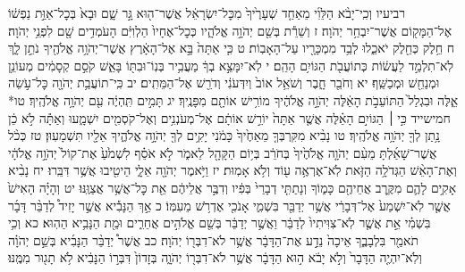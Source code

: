 \documentclass[twoside, openany, parskip=half, 11pt]{book}
\begin{document}
רביעיו וְכִֽי־יָבֹ֨א הַלֵּוִ֜י מֵאַחַ֤ד שְׁעָרֶ֙יךָ֙ מִכׇּל־יִשְׂרָאֵ֔ל אֲשֶׁר־ה֖וּא גָּ֣ר שָׁ֑ם וּבָא֙ בְּכׇל־אַוַּ֣ת נַפְשׁ֔וֹ אֶל־הַמָּק֖וֹם אֲשֶׁר־יִבְחַ֥ר יְהֹוָה׃ ז וְשֵׁרֵ֕ת בְּשֵׁ֖ם יְהֹוָ֣ה אֱלֹהָ֑יו כְּכׇל־אֶחָיו֙ הַלְוִיִּ֔ם הָעֹמְדִ֥ים שָׁ֖ם לִפְנֵ֥י יְהֹוָה׃ ח חֵ֥לֶק כְּחֵ֖לֶק יֹאכֵ֑לוּ לְבַ֥ד מִמְכָּרָ֖יו עַל־הָאָבֽוֹת׃
ט כִּ֤י אַתָּה֙ בָּ֣א אֶל־הָאָ֔רֶץ אֲשֶׁר־יְהֹוָ֥ה אֱלֹהֶ֖יךָ נֹתֵ֣ן לָ֑ךְ לֹֽא־תִלְמַ֣ד לַעֲשׂ֔וֹת כְּתוֹעֲבֹ֖ת הַגּוֹיִ֥ם הָהֵֽם׃ י לֹֽא־יִמָּצֵ֣א בְךָ֔ מַעֲבִ֥יר בְּנֽוֹ־וּבִתּ֖וֹ בָּאֵ֑שׁ קֹסֵ֣ם קְסָמִ֔ים מְעוֹנֵ֥ן וּמְנַחֵ֖שׁ וּמְכַשֵּֽׁף׃ יא וְחֹבֵ֖ר חָ֑בֶר וְשֹׁאֵ֥ל אוֹב֙ וְיִדְּעֹנִ֔י וְדֹרֵ֖שׁ אֶל־הַמֵּתִֽים׃ יב כִּֽי־תוֹעֲבַ֥ת יְהֹוָ֖ה כׇּל־עֹ֣שֵׂה אֵ֑לֶּה וּבִגְלַל֙ הַתּוֹעֵבֹ֣ת הָאֵ֔לֶּה יְהֹוָ֣ה אֱלֹהֶ֔יךָ מוֹרִ֥ישׁ אוֹתָ֖ם מִפָּנֶֽיךָ׃ יג תָּמִ֣ים תִּֽהְיֶ֔ה עִ֖ם יְהֹוָ֥ה אֱלֹהֶֽיךָ׃ טו* חמישייד כִּ֣י ׀ הַגּוֹיִ֣ם הָאֵ֗לֶּה אֲשֶׁ֤ר אַתָּה֙ יוֹרֵ֣שׁ אוֹתָ֔ם אֶל־מְעֹנְנִ֥ים וְאֶל־קֹסְמִ֖ים יִשְׁמָ֑עוּ וְאַתָּ֕ה לֹ֣א כֵ֔ן נָ֥תַן לְךָ֖ יְהֹוָ֥ה אֱלֹהֶֽיךָ׃ טו נָבִ֨יא מִקִּרְבְּךָ֤ מֵאַחֶ֙יךָ֙ כָּמֹ֔נִי יָקִ֥ים לְךָ֖ יְהֹוָ֣ה אֱלֹהֶ֑יךָ אֵלָ֖יו תִּשְׁמָעֽוּן׃ טז כְּכֹ֨ל אֲשֶׁר־שָׁאַ֜לְתָּ מֵעִ֨ם יְהֹוָ֤ה אֱלֹהֶ֙יךָ֙ בְּחֹרֵ֔ב בְּי֥וֹם הַקָּהָ֖ל לֵאמֹ֑ר לֹ֣א אֹסֵ֗ף לִשְׁמֹ֙עַ֙ אֶת־קוֹל֙ יְהֹוָ֣ה אֱלֹהָ֔י וְאֶת־הָאֵ֨שׁ הַגְּדֹלָ֥ה הַזֹּ֛את לֹֽא־אֶרְאֶ֥ה ע֖וֹד וְלֹ֥א אָמֽוּת׃ יז וַיֹּ֥אמֶר יְהֹוָ֖ה אֵלָ֑י הֵיטִ֖יבוּ אֲשֶׁ֥ר דִּבֵּֽרוּ׃ יח נָבִ֨יא אָקִ֥ים לָהֶ֛ם מִקֶּ֥רֶב אֲחֵיהֶ֖ם כָּמ֑וֹךָ וְנָתַתִּ֤י דְבָרַי֙ בְּפִ֔יו וְדִבֶּ֣ר אֲלֵיהֶ֔ם אֵ֖ת כׇּל־אֲשֶׁ֥ר אֲצַוֶּֽנּוּ׃ יט וְהָיָ֗ה הָאִישׁ֙ אֲשֶׁ֤ר לֹֽא־יִשְׁמַע֙ אֶל־דְּבָרַ֔י אֲשֶׁ֥ר יְדַבֵּ֖ר בִּשְׁמִ֑י אָנֹכִ֖י אֶדְרֹ֥שׁ מֵעִמּֽוֹ׃ כ אַ֣ךְ הַנָּבִ֡יא אֲשֶׁ֣ר יָזִיד֩ לְדַבֵּ֨ר דָּבָ֜ר בִּשְׁמִ֗י אֵ֣ת אֲשֶׁ֤ר לֹֽא־צִוִּיתִיו֙ לְדַבֵּ֔ר וַאֲשֶׁ֣ר יְדַבֵּ֔ר בְּשֵׁ֖ם אֱלֹהִ֣ים אֲחֵרִ֑ים וּמֵ֖ת הַנָּבִ֥יא הַהֽוּא׃ כא וְכִ֥י תֹאמַ֖ר בִּלְבָבֶ֑ךָ אֵיכָה֙ נֵדַ֣ע אֶת־הַדָּבָ֔ר אֲשֶׁ֥ר לֹא־דִבְּר֖וֹ יְהֹוָה׃ כב אֲשֶׁר֩ יְדַבֵּ֨ר הַנָּבִ֜יא בְּשֵׁ֣ם יְהֹוָ֗ה וְלֹֽא־יִהְיֶ֤ה הַדָּבָר֙ וְלֹ֣א יָבֹ֔א ה֣וּא הַדָּבָ֔ר אֲשֶׁ֥ר לֹא־דִבְּר֖וֹ יְהֹוָ֑ה בְּזָדוֹן֙ דִּבְּר֣וֹ הַנָּבִ֔יא לֹ֥א תָג֖וּר מִמֶּֽנּוּ׃
\end{document}
